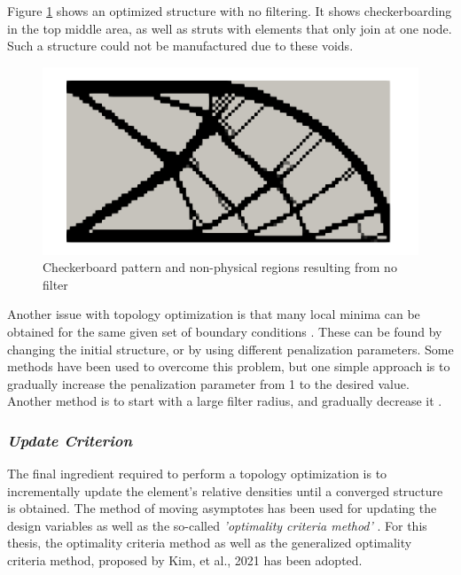 Figure \ref{fig:no_filtering} shows an optimized structure with no filtering. It shows checkerboarding in the top middle area, as well as struts with elements that only join at one node. Such a structure could not be manufactured due to these voids.
\begin{figure}[ht]
    \centering
    \includegraphics[width=0.8\linewidth]{figures/chapter_3/OptNoFilter.png}
    \caption{Checkerboard pattern and non-physical regions resulting from no filter}
    \label{fig:no_filtering}
\end{figure}

Another issue with topology optimization is that many local minima can be obtained for the same given set of boundary conditions \cite{Bendsøe_2004}. These can be found by changing the initial structure, or by using different penalization parameters. Some methods have been used to overcome this problem, but one simple approach is to gradually increase the penalization parameter from 1 to the desired value. Another method is to start with a large filter radius, and gradually decrease it \cite{Bendsøe_2004}.

\subsubsection*{\emph{Update Criterion}}
The final ingredient required to perform a topology optimization is to incrementally update the element's relative densities until a converged structure is obtained. The method of moving asymptotes has been used for updating the design variables \cite{Svanberg_1987} as well as the so-called \emph{'optimality criteria method'} \cite{Bendsøe_2004}. For this thesis, the optimality criteria method as well as the generalized optimality criteria method, proposed by Kim, et al., 2021 \cite{Kim_Dong_Weinberg_Dalidd_2021} has been adopted.

